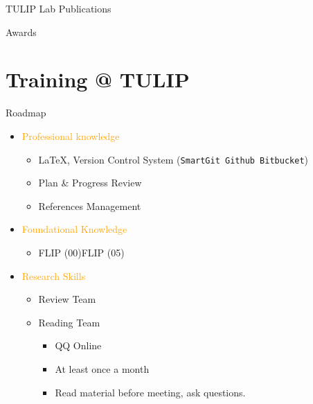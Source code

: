 \documentclass[
 size=14pt,
 paper=smartboard,  %
 mode=present, 		%
 display=slides, 	%
 style=tuliplab,  	%
 pauseslide,
 fleqn,leqno]{powerdot}
\newcommand{\draftnote}[3]{
	\todo[author=#2,color=#1!30,size=\footnotesize]{\textsf{#3}}	}
\newcommand{\gangli}[1]{\draftnote{blue}{GLi:}{#1}}
\begin{document}
\begin{slide}[toc=,bm=]{TULIP Lab Publications}


\end{slide}

\begin{slide}[toc=,bm=]{Awards}


\end{slide}


\section{Training @ TULIP}


\begin{slide}{Roadmap}
\begin{itemize}
  \item \textcolor{orange}{Professional knowledge}
    \begin{itemize}
          \item \LaTeX{},
                Version Control System (\texttt{SmartGit Github Bitbucket})
          \item Plan \& Progress Review
          \item References Management
        \end{itemize}
  \item \textcolor{orange}{Foundational Knowledge}
    \begin{itemize}
      \item FLIP (00)\texttildelow FLIP (05)
    \end{itemize}
  \item \textcolor{orange}{Research Skills}
    \begin{itemize}
      \item Review Team
      \item Reading Team
        \begin{itemize}
          \item QQ Online
          \item At least once a month
          \item Read material before meeting,
                ask questions.
        \end{itemize}
    \end{itemize}
\end{itemize}
\end{slide}
\end{document}
